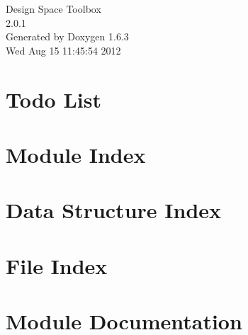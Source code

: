 \documentclass[a4paper]{book}
\begin{document}
\hypersetup{pageanchor=false}
\begin{titlepage}
\vspace*{7cm}
\begin{center}
{\Large Design Space Toolbox \\[1ex]\large 2.0.1 }\\
\vspace*{1cm}
{\large Generated by Doxygen 1.6.3}\\
\vspace*{0.5cm}
{\small Wed Aug 15 11:45:54 2012}\\
\end{center}
\end{titlepage}
\clearemptydoublepage
{}
\tableofcontents
\clearemptydoublepage
{}
\hypersetup{pageanchor=true}
\chapter{Todo List}
\label{todo}
\hypertarget{todo}{}

\chapter{Module Index}

\chapter{Data Structure Index}

\chapter{File Index}

\chapter{Module Documentation}









\end{document}
